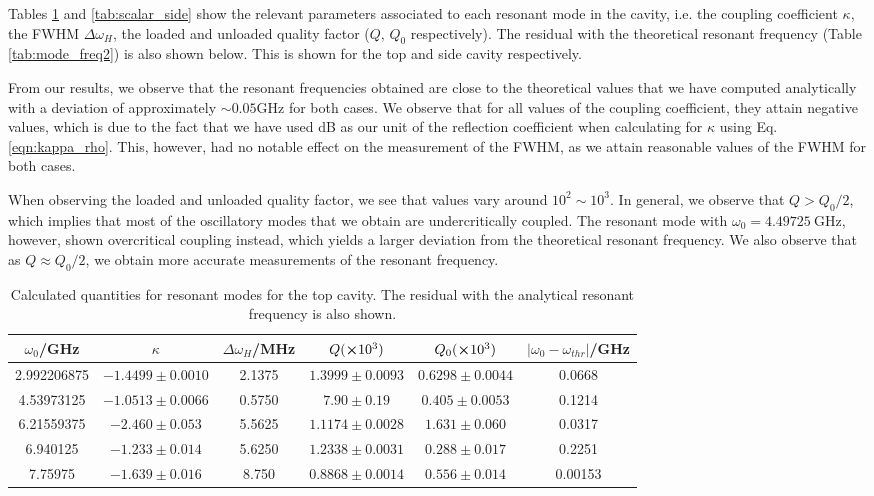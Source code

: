 \documentclass[a4paper]{report}
\numberwithin{equation}{section}
\begin{document}
Tables \ref{tab:scalar_top} and \ref{tab:scalar_side} show the relevant parameters associated to each resonant mode in the cavity, i.e. the coupling coefficient $\kappa$, 
the FWHM $\Delta\omega_H$, the loaded and unloaded quality factor ($Q$, $Q_0$ respectively). The residual with the theoretical resonant frequency (Table \ref{tab:mode_freq2})
 is also shown below. This is shown for the top and side cavity respectively. \par 

From our results, we observe that the resonant frequencies obtained are close to the theoretical values that we have computed analytically with a deviation of approximately 
$\sim 0.05 \si{\giga\hertz}$ for both cases. We observe that for all values of the coupling coefficient, they attain negative values, which is due to the fact that we have used 
dB as our unit of the reflection coefficient when calculating for $\kappa$ using Eq. \ref{eqn:kappa_rho}. This, however, had no notable effect on the measurement of the FWHM, as 
we attain reasonable values of the FWHM for both cases. \par 

When observing the loaded and unloaded quality factor, we see that values vary around $10^2 \sim 10^3$. In general, we observe that $Q > Q_0 / 2$, which implies
that most of the oscillatory modes that we obtain are undercritically coupled. The resonant mode with $\omega_0 = \SI{4.49725}{\giga\hertz}$, however, shown overcritical 
coupling instead, which yields a larger deviation from the theoretical resonant frequency. We also observe that as $Q \approx Q_0 / 2$, we obtain more accurate measurements
of the resonant frequency. \par  



\begin{table}[h!]
	\centering
	\begin{tabular}{|c|c|c|c|c|c|}
		\hline $\omega_0$/GHz & $\kappa$ & $\Delta\omega_H$/MHz & $Q (\cross 10^3) $ & $Q_0 (\cross 10^3)$ & $\left| \omega_0 - \omega_{thr} \right|$/GHz \\ 
		\hline 2.992206875 & $-1.4499 \pm 0.0010$  & 2.1375 & $1.3999 \pm 0.0093$ & $0.6298 \pm 0.0044$ & 0.0668\\ 
		\hline 4.53973125 &  $-1.0513 \pm 0.0066$ &  0.5750 & $7.90 \pm 0.19$ & $0.405 \pm 0.0053$ & 0.1214\\
		\hline 6.21559375 &  $ -2.460 \pm 0.053$  & 5.5625 & $1.1174 \pm 0.0028$ & $1.631 \pm 0.060$ & 0.0317\\
		\hline 6.940125 &  $-1.233 \pm 0.014$  & 5.6250 & $1.2338 \pm 0.0031$ & $0.288 \pm 0.017$ & 0.2251\\ 
		\hline 7.75975 &  $-1.639 \pm 0.016$  & 8.750 & $0.8868 \pm 0.0014$ & $0.556 \pm 0.014$ & 0.00153\\ 
		\hline
	\end{tabular}
	\caption{Calculated quantities for resonant modes for the top cavity. The residual with the analytical resonant frequency is also shown.}
	\label{tab:scalar_top}
\end{table}
\end{document}
